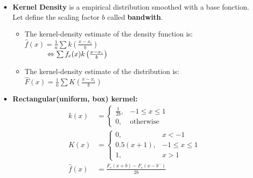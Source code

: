 \documentclass[10pt, french]{article}
\begin{document}
\begin{multicols*}{3}
\begin{itemize}[align=left,leftmargin=*]
    \item \textbf{Kernel Density} is a empirical distribution smoothed with a base fonction. Let define the scaling factor $b$ called \textbf{bandwith}. \\
    \begin{itemize}
        \item  The kernel-density estimate of the density function is: $\hat{f}(x) = \frac{1}{n} \sum k \left( \frac{x-x_i}{b} \right)$ \\ $\hspace*{1.1cm} \Leftrightarrow \sum f_e(x)k\left( \frac{x-x_i}{b} \right)$
        \item  The kernel-density estimate of the distribution is: $\hat{F}(x) = \frac{1}{n} \sum K \left( \frac{x-x_i}{b} \right)$
    \end{itemize}
    \item \textbf{Rectangular(uniform, box) kermel:} 
    \begin{align*}
        k(x) &= 
            \left\{
                \begin{array}{cc}
                    \frac{1}{2b}, & -1 \leq x \leq 1 \\
                    0,   & \mathrm{otherwise}
                \end{array} 
            \right. \\
        K(x) &= 
        \left\{
            \begin{array}{cc}
                0, & x < -1 \\
                0.5(x+1), & -1 \leq x \leq 1 \\ 
                1,   & x > 1 
            \end{array} 
        \right.\\
        \hat{f}(x) &= \frac{F_e(x+b)-F_e(x-b^-)}{2b}
    \end{align*}


\end{itemize}
\end{multicols*}
\end{document}

